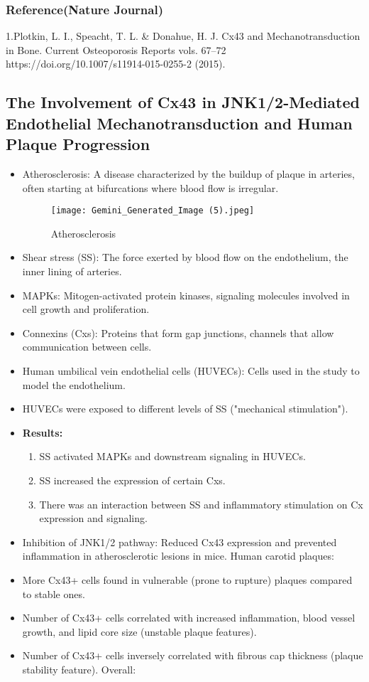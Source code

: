 \documentclass{article}
\begin{document}
\subsubsection{Reference(Nature Journal)}
1.Plotkin, L. I., Speacht, T. L. \& Donahue, H. J. Cx43 and Mechanotransduction in Bone. Current Osteoporosis Reports vols. 67–72 https://doi.org/10.1007/s11914-015-0255-2 (2015).
\newpage
\subsection{The Involvement of Cx43 in JNK1/2-Mediated Endothelial Mechanotransduction and Human Plaque Progression}
\begin{itemize}
\item  Atherosclerosis: A disease characterized by the buildup of plaque in arteries, often starting at bifurcations where blood flow is irregular.

 \begin{figure}[h]
    \centering
    \texttt{[image: Gemini\_Generated\_Image (5).jpeg]}
    \caption{Atherosclerosis}
    \label{fig:enter-label}
\end{figure}

 \item Shear stress (SS): The force exerted by blood flow on the endothelium, the inner lining of arteries.
 
\item MAPKs: Mitogen-activated protein kinases, signaling molecules involved in cell growth and proliferation.
 \item Connexins (Cxs): Proteins that form gap junctions, channels that allow communication between cells.
\item Human umbilical vein endothelial cells (HUVECs): Cells used in the study to model the endothelium.
\item HUVECs were exposed to different levels of SS ("mechanical stimulation").
\item \textbf{Results:
}
\begin{enumerate}
    \item 
SS activated MAPKs and downstream signaling in HUVECs.
\item SS increased the expression of certain Cxs.
\item There was an interaction between SS and inflammatory stimulation on Cx expression and signaling.
\end{enumerate}
\item Inhibition of JNK1/2 pathway: Reduced Cx43 expression and prevented inflammation in atherosclerotic lesions in mice.
Human carotid plaques:
\item More Cx43+ cells found in vulnerable (prone to rupture) plaques compared to stable ones.
\item Number of Cx43+ cells correlated with increased inflammation, blood vessel growth, and lipid core size (unstable plaque features).
\item Number of Cx43+ cells inversely correlated with fibrous cap thickness (plaque stability feature).
Overall:
\end{itemize}
\end{document}
